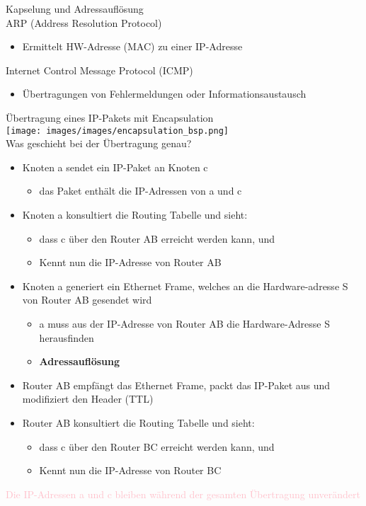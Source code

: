 \begin{KR}{Kapselung und Adressauflösung}\\
    ARP (Address Resolution Protocol)
    \begin{itemize}
        \item Ermittelt HW-Adresse (MAC) zu einer IP-Adresse
    \end{itemize}
    Internet Control Message Protocol (ICMP)
    \begin{itemize}
        \item Übertragungen von Fehlermeldungen oder Informationsaustausch
    \end{itemize}
\end{KR}

\begin{example2}{Übertragung eines IP-Pakets mit Encapsulation}\\
    \texttt{[image: images/images/encapsulation\_bsp.png]}\\
    Was geschieht bei der Übertragung genau?
    \begin{itemize}
        \item Knoten a sendet ein IP-Paket an Knoten c
        \begin{itemize}
            \item das Paket enthält die IP-Adressen von a und c
        \end{itemize}
        \item Knoten a konsultiert die Routing Tabelle und sieht:
        \begin{itemize}
            \item dass c über den Router AB erreicht werden kann, und
            \item Kennt nun die IP-Adresse von Router AB
        \end{itemize}
        \item Knoten a generiert ein Ethernet Frame, welches an die Hardware-adresse S von Router AB gesendet wird
        \begin{itemize}
            \item a muss aus der IP-Adresse von Router AB die Hardware-Adresse S herausfinden
            \item \textbf{Adressauflösung}
        \end{itemize}
        \item Router AB empfängt das Ethernet Frame, packt das IP-Paket aus und modifiziert den Header (TTL)
        \item Router AB konsultiert die Routing Tabelle und sieht:
        \begin{itemize}
            \item dass c über den Router BC erreicht werden kann, und
            \item Kennt nun die IP-Adresse von Router BC
        \end{itemize}
    \end{itemize}
    \textcolor{pink}{Die IP-Adressen a und c bleiben während der gesamten Übertragung unverändert}\\
\end{example2}

